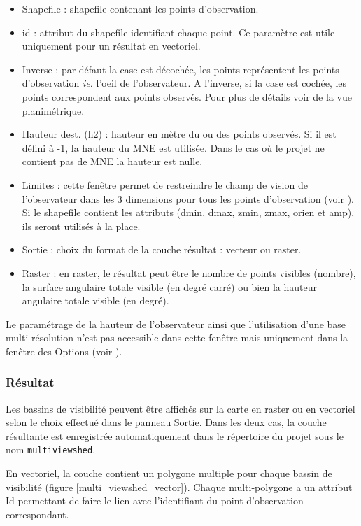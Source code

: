 \documentclass{report}
\begin{document}
\begin{itemize}
	\item Shapefile : shapefile contenant les points d'observation.
	\item id : attribut du shapefile identifiant chaque point. Ce paramètre est utile uniquement pour un résultat en vectoriel.
	\item Inverse : par défaut la case est décochée, les points représentent les points d'observation \textit{ie.} l'oeil de l'observateur. A l'inverse, si la case est cochée, les points correspondent aux points observés. Pour plus de détails voir  de la vue planimétrique.
	\item Hauteur dest. (h2) : hauteur en mètre du ou des points observés. Si il est défini à -1, la hauteur du MNE est utilisée. Dans le cas où le projet ne contient pas de MNE la hauteur est nulle.
	\item Limites : cette fenêtre permet de restreindre le champ de vision de l'observateur dans les 3 dimensions pour tous les points d'observation (voir ). Si le shapefile contient les attributs (dmin, dmax, zmin, zmax, orien et amp), ils seront utilisés à la place.
	\item Sortie : choix du format de la couche résultat : vecteur ou raster.
	\item Raster : en raster, le résultat peut être le nombre de points visibles (nombre), la surface angulaire totale visible (en degré carré) ou bien la hauteur angulaire totale visible (en degré).
\end{itemize}

Le paramétrage de la hauteur de l'observateur ainsi que l'utilisation d'une base multi-résolution n'est pas accessible dans cette fenêtre mais uniquement dans la fenêtre des Options (voir ).

\subsubsection{Résultat}
Les bassins de visibilité peuvent être affichés sur la carte en raster ou en vectoriel selon le choix effectué dans le panneau Sortie. Dans les deux cas, la couche résultante est enregistrée automatiquement dans le répertoire du projet sous le nom \verb|multiviewshed|.

En vectoriel, la couche contient un polygone multiple pour chaque bassin de visibilité (figure \ref{multi_viewshed_vector}). Chaque multi-polygone a un attribut Id permettant de faire le lien avec l'identifiant du point d'observation correspondant.
\end{document}
